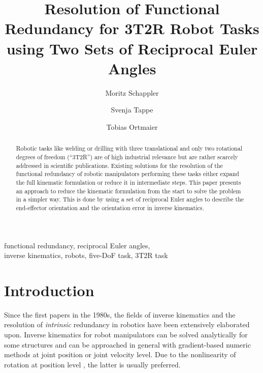 \documentclass{svproc}
\begin{document}
    
\mainmatter              %
%
\title{Resolution of Functional Redundancy for 3T2R Robot Tasks  \\ using Two Sets of Reciprocal Euler Angles}
%
%
\author{Moritz Schappler \and Svenja Tappe \and Tobias Ortmaier }
%
%
%

\maketitle              %


\begin{abstract}
Robotic tasks like welding or drilling with three translational and only two rotational degrees of freedom (``3T2R'') are of high industrial relevance but are ra\-ther scarcely addressed in scientific publications.
Existing solutions for the resolution of the functional redundancy of robotic manipulators performing these tasks either expand the full kinematic formulation or reduce it in intermediate steps.
This paper presents an approach to reduce the kinematic formulation from the start to solve the problem in a simpler way.
This is done by using a set of reciprocal Euler angles to describe the end-effector orientation and the orientation error in inverse kinematics.
\end{abstract}

\begin{keywords}
functional redundancy, reciprocal Euler angles, \\ inverse kinematics, robots, five-DoF task, 3T2R task
\end{keywords}

\section{Introduction}
\label{sec:Intro}
Since the first papers in the 1980s, the fields of inverse kinematics \cite{GoldenbergBenFen1985} and the resolution of \emph{intrinsic} redundancy \cite{Yoshikawa1984} in robotics have been extensively elaborated upon.
Inverse kinematics for robot manipulators can be solved analytically for some structures and can be approached in general with gradient-based numeric methods at  joint position or joint velocity level.
Due to the nonlinearity of rotation at position level \cite{GoldenbergBenFen1985}, the latter is usually preferred.
\end{document}
